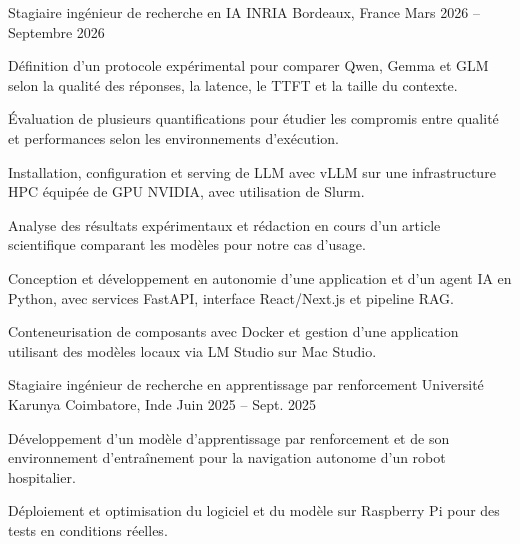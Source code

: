 
\begin{cventries}
  \cventry
    {Stagiaire ingénieur de recherche en IA}
    {INRIA}
    {Bordeaux, France}
    {Mars 2026 -- Septembre 2026}
    {
      \begin{cvitems}
        \item {Définition d’un protocole expérimental pour comparer Qwen, Gemma et GLM selon la qualité des réponses, la latence, le TTFT et la taille du contexte.}
        \item {Évaluation de plusieurs quantifications pour étudier les compromis entre qualité et performances selon les environnements d’exécution.}
        \item {Installation, configuration et serving de LLM avec vLLM sur une infrastructure HPC équipée de GPU NVIDIA, avec utilisation de Slurm.}
        \item {Analyse des résultats expérimentaux et rédaction en cours d’un article scientifique comparant les modèles pour notre cas d’usage.}
        \item {Conception et développement en autonomie d’une application et d’un agent IA en Python, avec services FastAPI, interface React/Next.js et pipeline RAG.}
        \item {Conteneurisation de composants avec Docker et gestion d’une application utilisant des modèles locaux via LM Studio sur Mac Studio.}
      \end{cvitems}
    }

  \cventry
    {Stagiaire ingénieur de recherche en apprentissage par renforcement}
    {Université Karunya}
    {Coimbatore, Inde}
    {Juin 2025 -- Sept. 2025}
    {
      \begin{cvitems}
        \item {Développement d’un modèle d’apprentissage par renforcement et de son environnement d’entraînement pour la navigation autonome d’un robot hospitalier.}
        \item {Déploiement et optimisation du logiciel et du modèle sur Raspberry Pi pour des tests en conditions réelles.}
      \end{cvitems}
    }
\end{cventries}
